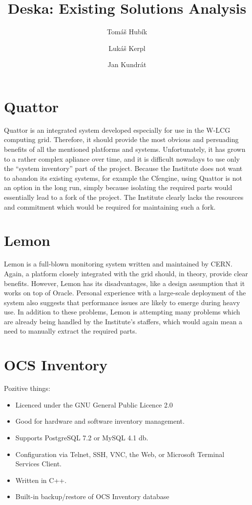 \documentclass[12pt]{article}
\author{Tomáš Hubík \and Lukáš Kerpl \and Jan Kundrát}
\title{Deska: Existing Solutions Analysis}
\begin{document}
\maketitle

\newpage

\tableofcontents

\newpage

\section{Quattor}

Quattor is an integrated system developed especially for use in the W-LCG
computing grid.  Therefore, it should provide the most obvious and persuading
benefits of all the mentioned platforms and systems.  Unfortunately, it has
grown to a rather complex apliance over time, and it is difficult nowadays to
use only the ``system inventory'' part of the project.  Because the Institute
does not want to abandon its existing systems, for example the Cfengine, using
Quattor is not an option in the long run, simply because isolating the required
parts would essentially lead to a fork of the project.  The Institute clearly
lacks the resources and commitment which would be required for maintaining such
a fork.


\section{Lemon}

Lemon is a full-blown monitoring system written and maintained by CERN.  Again,
a platform closely integrated with the grid should, in theory, provide clear
benefits.  However, Lemon has its disadvantages, like a design assumption that
it works on top of Oracle.  Personal experience with a large-scale deployment of
the system also suggests that performance issues are likely to emerge during
heavy use.  In addition to these problems, Lemon is attempting many problems
which are already being handled by the Institute's staffers, which would again
mean a need to manually extract the required parts.


\section{OCS Inventory}
Pozitive things:
\begin{itemize}
\item Licenced under the GNU General Public Licence 2.0
\item Good for hardware and software inventory management.
\item Supports PostgreSQL 7.2 or MySQL 4.1 db.
\item Configuration via Telnet, SSH, VNC, the Web, or Microsoft Terminal Services Client.
\item Written in C++.
\item Built-in backup/restore of OCS Inventory database
\end{itemize}
\end{document}
